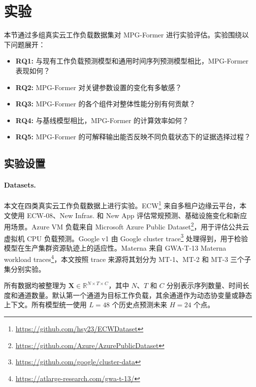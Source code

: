 \documentclass[UTF8]{ctexart}
\begin{document}
\newpage

\section{实验}

本节通过多组真实云工作负载数据集对 MPG-Former 进行实验评估。实验围绕以下问题展开：
\begin{itemize}
    \item \textbf{RQ1:} 与现有工作负载预测模型和通用时间序列预测模型相比，MPG-Former 表现如何？
    \item \textbf{RQ2:} MPG-Former 对关键参数设置的变化有多敏感？
    \item \textbf{RQ3:} MPG-Former 的各个组件对整体性能分别有何贡献？
    \item \textbf{RQ4:} 与基线模型相比，MPG-Former 的计算效率如何？
    \item \textbf{RQ5:} MPG-Former 的可解释输出能否反映不同负载状态下的证据选择过程？
\end{itemize}

\subsection{实验设置}

\paragraph{Datasets.}
本文在四类真实云工作负载数据上进行实验。ECW\footnote{\url{https://github.com/hsy23/ECWDataset}} 来自多租户边缘云平台，本文使用 ECW-08、New Infras. 和 New App 评估常规预测、基础设施变化和新应用场景。Azure VM 负载来自 Microsoft Azure Public Dataset\footnote{\url{https://github.com/Azure/AzurePublicDataset}}，用于评估公共云虚拟机 CPU 负载预测。Google v1 由 Google cluster trace\footnote{\url{https://github.com/google/cluster-data}} 处理得到，用于检验模型在生产集群资源轨迹上的适应性。Materna 来自 GWA-T-13 Materna workload traces\footnote{\url{https://atlarge-research.com/gwa-t-13/}}，本文按照 trace 来源将其划分为 MT-1、MT-2 和 MT-3 三个子集分别实验。

所有数据均被整理为 $\mathbf X\in\mathbb R^{N\times T\times C}$，其中 $N$、$T$ 和 $C$ 分别表示序列数量、时间长度和通道数量。默认第一个通道为目标工作负载，其余通道作为动态协变量或静态上下文。所有模型统一使用 $L=48$ 个历史点预测未来 $H=24$ 个点。
\end{document}
